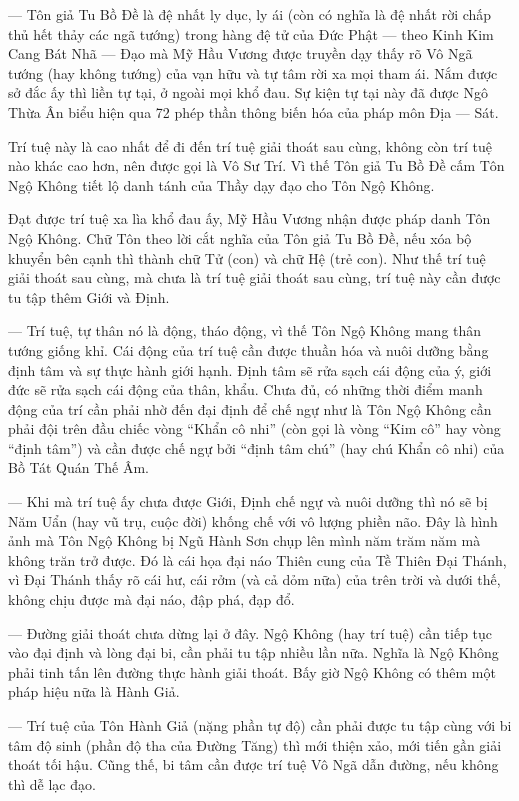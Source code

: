 — Tôn giả Tu Bồ Đề là đệ nhất ly dục, ly ái (còn có nghĩa là đệ nhất rời chấp thủ hết thảy các ngã tướng) trong hàng đệ tử của Đức Phật — theo Kinh Kim Cang Bát Nhã — Đạo mà Mỹ Hầu Vương được truyền dạy thấy rõ Vô Ngã tướng (hay không tướng) của vạn hữu và tự tâm rời xa mọi tham ái. Nắm được sở đắc ấy thì liền tự tại, ở ngoài mọi khổ đau. Sự kiện tự tại này đã được Ngô Thừa Ân biểu hiện qua 72 phép thần thông biến hóa của pháp môn Địa — Sát.

Trí tuệ này là cao nhất để đi đến trí tuệ giải thoát sau cùng, không còn trí tuệ nào khác cao hơn, nên được gọi là Vô Sư Trí. Vì thế Tôn giả Tu Bồ Đề cấm Tôn Ngộ Không tiết lộ danh tánh của Thầy dạy đạo cho Tôn Ngộ Không.

Đạt được trí tuệ xa lìa khổ đau ấy, Mỹ Hầu Vương nhận được pháp danh Tôn Ngộ Không. Chữ Tôn theo lời cắt nghĩa của Tôn giả Tu Bồ Đề, nếu xóa bộ khuyển bên cạnh thì thành chữ Tử (con) và chữ Hệ (trẻ con). Như thế trí tuệ giải thoát sau cùng, mà chưa là trí tuệ giải thoát sau cùng, trí tuệ này cần được tu tập thêm Giới và Định.

— Trí tuệ, tự thân nó là động, tháo động, vì thế Tôn Ngộ Không mang thân tướng giống khỉ. Cái động của trí tuệ cần được thuần hóa và nuôi dưỡng bằng định tâm và sự thực hành giới hạnh. Định tâm sẽ rửa sạch cái động của ý, giới đức sẽ rửa sạch cái động của thân, khẩu. Chưa đủ, có những thời điểm manh động của trí cần phải nhờ đến đại định để chế ngự như là Tôn Ngộ Không cần phải đội trên đầu chiếc vòng ``Khẩn cô nhi'' (còn gọi là vòng ``Kim cô'' hay vòng ``định tâm'') và cần được chế ngự bởi ``định tâm chú'' (hay chú Khẩn cô nhi) của Bồ Tát Quán Thế Âm.

— Khi mà trí tuệ ấy chưa được Giới, Định chế ngự và nuôi dưỡng thì nó sẽ bị Năm Uẩn (hay vũ trụ, cuộc đời) khống chế với vô lượng phiền não. Đây là hình ảnh mà Tôn Ngộ Không bị Ngũ Hành Sơn chụp lên mình năm trăm năm mà không trăn trở được. Đó là cái họa đại náo Thiên cung của Tề Thiên Đại Thánh, vì Đại Thánh thấy rõ cái hư, cái rởm (và cả dỏm nữa) của trên trời và dưới thế, không chịu được mà đại náo, đập phá, đạp đổ.

— Đường giải thoát chưa dừng lại ở đây. Ngộ Không (hay trí tuệ) cần tiếp tục vào đại định và lòng đại bi, cần phải tu tập nhiều lần nữa. Nghĩa là Ngộ Không phải tinh tấn lên đường thực hành giải thoát. Bấy giờ Ngộ Không có thêm một pháp hiệu nữa là Hành Giả.

— Trí tuệ của Tôn Hành Giả (nặng phần tự độ) cần phải được tu tập cùng với bi tâm độ sinh (phần độ tha của Đường Tăng) thì mới thiện xảo, mới tiến gần giải thoát tối hậu. Cũng thế, bi tâm cần được trí tuệ Vô Ngã dẫn đường, nếu không thì dễ lạc đạo.

